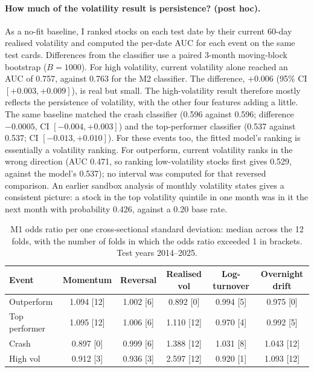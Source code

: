 \documentclass[11pt]{article}
\begin{document}
\paragraph{How much of the volatility result is persistence? (post hoc).} As a no-fit baseline, I ranked stocks on each test date by their current 60-day realised volatility and computed the per-date AUC for each event on the same test cards. Differences from the classifier use a paired 3-month moving-block bootstrap ($B=1000$). For high volatility, current volatility alone reached an AUC of 0.757, against 0.763 for the M2 classifier. The difference, $+0.006$ (95\% CI $[+0.003, +0.009]$), is real but small. The high-volatility result therefore mostly reflects the persistence of volatility, with the other four features adding a little. The same baseline matched the crash classifier (0.596 against 0.596; difference $-0.0005$, CI $[-0.004, +0.003]$) and the top-performer classifier (0.537 against 0.537; CI $[-0.013, +0.010]$). For these events too, the fitted model's ranking is essentially a volatility ranking. For outperform, current volatility ranks in the wrong direction (AUC 0.471, so ranking low-volatility stocks first gives 0.529, against the model's 0.537); no interval was computed for that reversed comparison. An earlier sandbox analysis of monthly volatility states gives a consistent picture: a stock in the top volatility quintile in one month was in it the next month with probability 0.426, against a 0.20 base rate.

\begin{table}[t]
\centering\small
\caption{M1 odds ratio per one cross-sectional standard deviation: median across the 12 folds, with the number of folds in which the odds ratio exceeded 1 in brackets. Test years 2014--2025.}
\label{tab:odds}
\begin{tabular}{@{}lccccc@{}}
\toprule
Event & Momentum & Reversal & Realised vol & Log-turnover & Overnight drift\\
\midrule
Outperform & 1.094 [12] & 1.002 [6] & 0.892 [0] & 0.994 [5] & 0.975 [0]\\
Top performer & 1.095 [12] & 1.006 [6] & 1.110 [12] & 0.970 [4] & 0.992 [5]\\
Crash & 0.897 [0] & 0.999 [6] & 1.388 [12] & 1.031 [8] & 1.043 [12]\\
High vol & 0.912 [3] & 0.936 [3] & 2.597 [12] & 0.920 [1] & 1.093 [12]\\
\bottomrule
\end{tabular}
\end{table}
\end{document}
